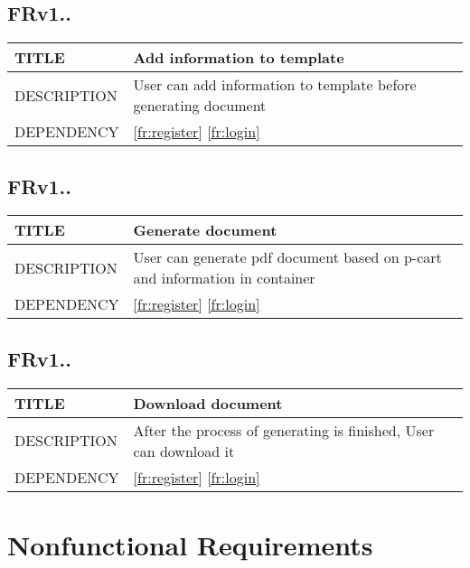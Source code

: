 \documentclass{scrreprt}
\begin{document}
\subsection{FRv1..}
\label{fr:addinfo}
\begin{center}
    \begin{tabular}{|l|L{9cm}|}
        \hline
         TITLE& Add information to template\\ \hline
         DESCRIPTION& User can add information to template before generating document\\ \hline
         DEPENDENCY& \ref{fr:register} \ref{fr:login}\\ \hline
    \end{tabular}
\end{center}

\subsection{FRv1..}
\label{fr:genpdf}
\begin{center}
    \begin{tabular}{|l|L{9cm}|}
        \hline
         TITLE& Generate document\\ \hline
         DESCRIPTION& User can generate pdf document based on p-cart and information in container    \\ \hline
         DEPENDENCY& \ref{fr:register} \ref{fr:login}\\ \hline
    \end{tabular}
\end{center}

\subsection{FRv1..}
\label{fr:downloadpdf}
\begin{center}
    \begin{tabular}{|l|L{9cm}|}
        \hline
         TITLE& Download document\\ \hline
         DESCRIPTION& After the process of generating is finished, User can download it \\ \hline
         DEPENDENCY& \ref{fr:register} \ref{fr:login}\\ \hline
    \end{tabular}
\end{center}

\section{Nonfunctional Requirements}
\end{document}
